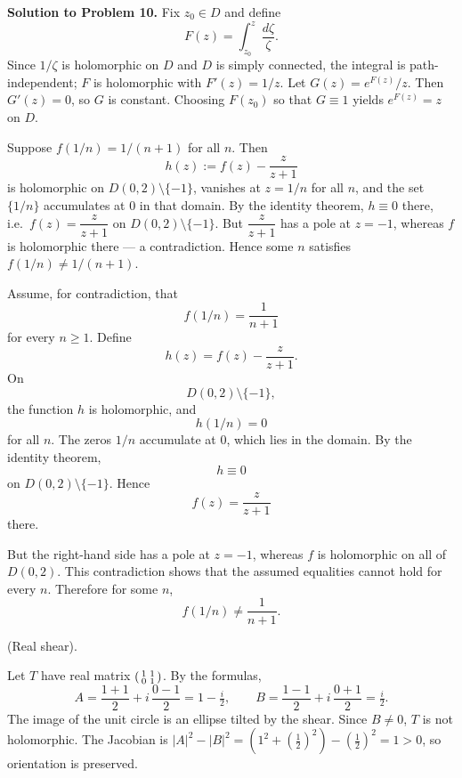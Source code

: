\begin{solution}
\par\medskip\noindent\textbf{Solution to Problem 10.}\quad 
Fix $z_0\in D$ and define
\[
F(z)=\int_{z_0}^{z}\frac{d\zeta}{\zeta}.
\]
Since $1/\zeta$ is holomorphic on $D$ and $D$ is simply connected, the integral is path-independent; $F$ is holomorphic with $F'(z)=1/z$.
Let $G(z)=e^{F(z)}/z$. Then $G'(z)=0$, so $G$ is constant. Choosing $F(z_0)$ so that $G\equiv 1$ yields $e^{F(z)}=z$ on $D$.

\bigskip
\end{solution}

\begin{problem}[CP-IV-0096]
\label{prob:cp-iv-0096}
\par\noindent\textbullet\quad Suppose $f(1/n)=1/(n+1)$ for all $n$. Then
	\[
	h(z):=f(z)-\frac{z}{z+1}
	\]
	is holomorphic on $D(0,2)\setminus\{-1\}$, vanishes at $z=1/n$ for all $n$, and the set $\{1/n\}$ accumulates at $0$ in that domain.
	By the identity theorem, $h\equiv 0$ there, i.e.\ $f(z)=\dfrac{z}{z+1}$ on $D(0,2)\setminus\{-1\}$.
	But $\dfrac{z}{z+1}$ has a pole at $z=-1$, whereas $f$ is holomorphic there — a contradiction.
	Hence some $n$ satisfies $f(1/n)\ne 1/(n+1)$.

\bigskip
\end{problem}

\begin{solution}
Assume, for contradiction, that
\[
f(1/n)=\frac{1}{n+1}
\]
for every \(n\ge1\). Define
\[
h(z)=f(z)-\frac{z}{z+1}.
\]
On
\[
D(0,2)\setminus\{-1\},
\]
the function \(h\) is holomorphic, and
\[
h(1/n)=0
\]
for all \(n\). The zeros \(1/n\) accumulate at \(0\), which lies in the domain. By the identity theorem,
\[
h\equiv0
\]
on \(D(0,2)\setminus\{-1\}\). Hence
\[
f(z)=\frac{z}{z+1}
\]
there.

But the right-hand side has a pole at \(z=-1\), whereas \(f\) is holomorphic on all of \(D(0,2)\). This contradiction shows that the assumed equalities cannot hold for every \(n\). Therefore for some \(n\),
\[
f(1/n)\neq\frac1{n+1}.
\]
\end{solution}


\begin{problem}[CP-IV-0097]
\label{prob:cp-iv-0097}
(Real shear).

Let $T$ have real matrix $\begin{psmallmatrix}1&1\\ 0&1\end{psmallmatrix}$.
By the formulas,
\[
A=\frac{1+1}{2}+i\,\frac{0-1}{2}=1-\tfrac{i}{2},\qquad
B=\frac{1-1}{2}+i\,\frac{0+1}{2}=\tfrac{i}{2}.
\]
The image of the unit circle is an ellipse tilted by the shear. Since $B\neq0$, $T$ is not holomorphic.
The Jacobian is $|A|^2-|B|^2=(1^2+(\tfrac12)^2)-(\tfrac12)^2=1>0$, so orientation is preserved.
\end{problem}

